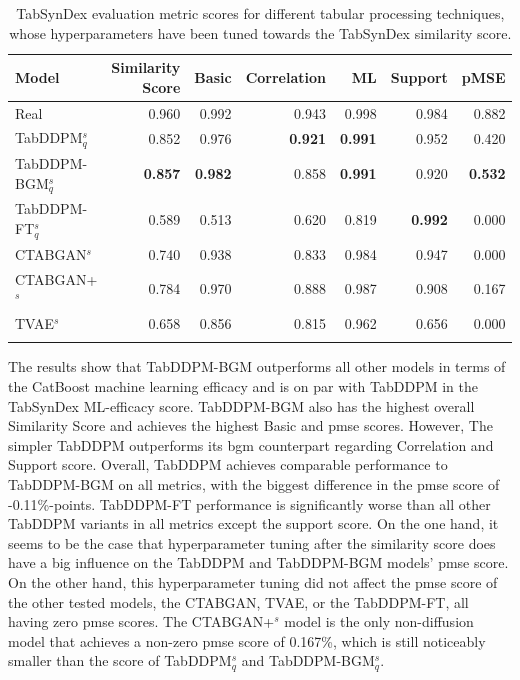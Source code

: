 \begin{table}[h]
	\centering
	\begin{tabular}{lrrrrrr}
		\toprule
		\textbf{Model}        & \textbf{Similarity Score} & \textbf{Basic} & \textbf{Correlation} & \textbf{ML}    & \textbf{Support} & \textbf{pMSE}  \\
		\midrule
		Real                  & 0.960                     & 0.992          & 0.943                & 0.998          & 0.984            & 0.882          \\
		TabDDPM$^{s}_{q}$     & 0.852                     & 0.976          & \textbf{0.921}       & \textbf{0.991} & 0.952            & 0.420          \\
		TabDDPM-BGM$^{s}_{q}$ & \textbf{0.857}            & \textbf{0.982} & 0.858                & \textbf{0.991} & 0.920            & \textbf{0.532} \\
		TabDDPM-FT$^{s}_{q}$  & 0.589                     & 0.513          & 0.620                & 0.819          & \textbf{0.992}   & 0.000          \\
		CTABGAN$^{s}$         & 0.740                     & 0.938          & 0.833                & 0.984          & 0.947            & 0.000          \\
		CTABGAN+$^{s}$        & 0.784                     & 0.970          & 0.888                & 0.987          & 0.908            & 0.167          \\
		TVAE$^{s}$            & 0.658                     & 0.856          & 0.815                & 0.962          & 0.656            & 0.000          \\
		\bottomrule
		\multicolumn{7}{c}{}\\[-0.6em]
	\end{tabular}
	\caption[Experiment 2 TabSynDex]{TabSynDex evaluation metric scores for different tabular processing techniques, whose hyperparameters have been tuned towards the TabSynDex similarity score.}
	\label{tab:exp2-sim}
\end{table}

The results show that TabDDPM-BGM outperforms all other models in terms of the CatBoost machine learning efficacy and is on par with TabDDPM in the TabSynDex ML-efficacy score.
TabDDPM-BGM also has the highest overall Similarity Score and achieves the highest Basic and \gls{pmse} scores.
However, The simpler TabDDPM outperforms its \gls{bgm} counterpart regarding Correlation and Support score.
Overall, TabDDPM achieves comparable performance to TabDDPM-BGM on all metrics, with the biggest difference in the \gls{pmse} score of -0.11\%-points.
TabDDPM-FT performance is significantly worse than all other TabDDPM variants in all metrics except the support score.
On the one hand, it seems to be the case that hyperparameter tuning after the similarity score does have a big influence on the TabDDPM and TabDDPM-BGM models' \gls{pmse} score.
On the other hand, this hyperparameter tuning did not affect the \gls{pmse} score of the other tested models, the CTABGAN, TVAE, or the TabDDPM-FT, all having zero \gls{pmse} scores.
The CTABGAN+$^{s}$ model is the only non-diffusion model that achieves a non-zero \gls{pmse} score of 0.167\%, which is still noticeably smaller than the score of TabDDPM$^{s}_{q}$ and TabDDPM-BGM$^{s}_{q}$.

